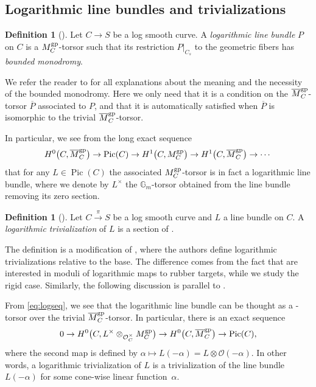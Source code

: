 \documentclass[pdftex]{sigma}
\newcommand{\Pic}{\operatorname{Pic}}
\renewcommand{\O}{\mathcal{O}}
\numberwithin{equation}{section}
\theoremstyle{definition}
\newtheorem{defi}[theo]{Definition}
\begin{document}
\subsection{Logarithmic line bundles and trivializations}
\begin{defi}[\cite{molchowiselog}]
 Let $C\to S$ be a log smooth curve. A \emph{logarithmic line bundle} $P$ on $C$ is a $M_C^{\rm gp}$-torsor such that its restriction $P\rvert_{C_s}$ to the geometric fibers has \emph{bounded monodromy}.
\end{defi}
We refer the reader to \cite{molchowiselog} for all explanations about the meaning and the necessity of the bounded monodromy. Here we only need that it is a condition on the $\overline{M}_C^{\rm gp}$-torsor $\overline{P}$ associated to $P$, and that it is automatically satisfied when $\overline{P}$ is isomorphic to the trivial $\overline{M}_C^{\rm gp}$-torsor.

In particular, we see from the long exact sequence
\[H^0\bigl(C,\overline{M}_C^{\rm gp}\bigr)\to\Pic(C)\to H^1\bigl(C,M_C^{\rm gp}\bigr)\to H^1\bigl(C,\overline{M}_C^{\rm gp}\bigr)\to\cdots\]
that for any $L\in \Pic(C)$ the associated $M_C^{\rm gp}$-torsor  is in fact a logarithmic line bundle, where we denote by $L^{\times}$ the $\mathbb{G}_m$-torsor obtained from the line bundle removing its zero section.

\begin{defi}[{\cite[Definition~4.5.1]{marcuswiselog}}]
 Let $C\xrightarrow{\pi} S$ be a log smooth curve and $L$ a line bundle on $C$. A \emph{logarithmic trivialization} of $L$ is a section of .
\end{defi}
The definition is a modification of \cite[Definition~4.5.1]{marcuswiselog}, where the authors define logarithmic trivializations relative to the base. The difference comes from the fact that \cite{marcuswiselog} are interested in moduli of logarithmic maps to rubber targets, while we study the rigid case.
Similarly, the following discussion is parallel to
\cite[Proposition~4.5.3]{marcuswiselog}.

From \eqref{eq:logseq}, we see that the logarithmic line bundle  can be thought as a -torsor over the trivial $\overline{M}_C^{\rm gp}$-torsor.
In particular, there is an exact sequence
\[0\to H^0\bigl(C,L^{\times}\otimes_{\mathcal O_C^{\times}}M_C^{\rm gp}\bigr)\to H^0\bigl(C, \overline{M}_C^{\rm gp}\bigr)\to\Pic(C),
 \]
where the second map is defined by
$\alpha\mapsto L(-\alpha)=L\otimes\O(-\alpha)$.
In other words, a logarithmic trivialization of $L$ is a trivialization of the line bundle $L(-\alpha)$ for some cone-wise linear function~$\alpha$.
\end{document}

